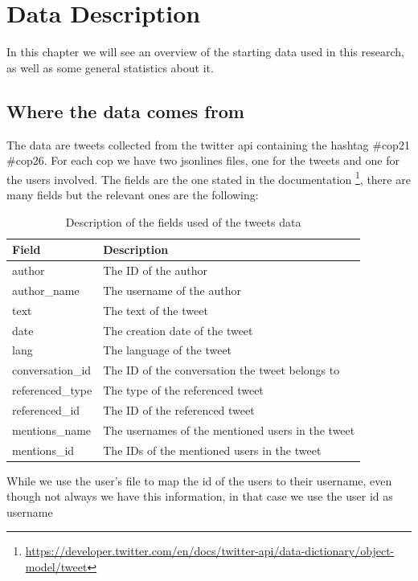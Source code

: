 \chapter{Data Description}%
In this chapter we will see an overview of the starting data used in this research, as well as some general statistics about it.

\section{Where the data comes from}
The data are tweets collected from the twitter api containing the hashtag \#cop21 #cop26. 
For each cop we have two jsonlines files, one for the tweets and one for the users involved. The fields are the one stated in the documentation \footnote{ \href{https://developer.twitter.com/en/docs/twitter-api/data-dictionary/object-model/tweet}{https://developer.twitter.com/en/docs/twitter-api/data-dictionary/object-model/tweet}}, there are many fields but the relevant ones are the following: 

\begin{table}[H]
\centering
\begin{tabular}{|l|l|}
\hline
\textbf{Field} & \textbf{Description} \\ \hline
author & The ID of the author \\ \hline
author\_name & The username of the author \\ \hline
text & The text of the tweet \\ \hline
date & The creation date of the tweet \\ \hline
lang & The language of the tweet \\ \hline
conversation\_id & The ID of the conversation the tweet belongs to \\ \hline
referenced\_type & The type of the referenced tweet \\ \hline
referenced\_id & The ID of the referenced tweet \\ \hline
mentions\_name & The usernames of the mentioned users in the tweet \\ \hline
mentions\_id & The IDs of the mentioned users in the tweet \\ \hline

\end{tabular}
\caption{Description of the fields used of the tweets data}
\label{tab:my_label}
\end{table}
While we use the user's file to map the id of the users to their username, even though not always we have this information, in that case we use the user id as username

